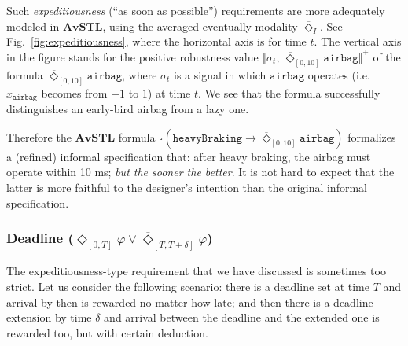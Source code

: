 \documentclass[envcountsect,orivec]{llncs} \usepackage{etex} \usepackage[]{graphicx}
\newcommand{\DiaOp}[1]{\Diamond_{#1}}
\newcommand{\BoxOp}[1]{\square_{#1}}
\newcommand{\TDiaOp}[1]{\overline{\Diamond}_{#1}}
\newcommand{\Robust}[2]{{ \llbracket #1,\, #2 \rrbracket}}
\newcommand{\AvSTL}{\textbf{AvSTL}}
\begin{document}
Such  \emph{expeditiousness} (``as soon as possible'') requirements
are more adequately  modeled in $\AvSTL$,  using the averaged-eventually modality
 $\TDiaOp{I}$. See Fig.~\ref{fig:expeditiousness}, where
the horizontal axis is
for time $t$. The vertical axis in the figure stands for the positive
robustness  value
$\Robust{\sigma_{t}}{\TDiaOp{[0,10]}\mathtt{airbag}}^{+}$ of the formula
$\TDiaOp{[0,10]}\mathtt{airbag}$, where $\sigma_{t}$ is a signal in
which $\mathtt{airbag}$ operates 
(i.e. $x_{\mathtt{airbag}}$ becomes from $-1$ to $1$) at time $t$. 
We see that the formula successfully distinguishes an early-bird
airbag from a lazy one.

Therefore the $\AvSTL$ formula
\begin{math}
     \BoxOp{} (
    \mathtt{heavyBraking} \to 
\TDiaOp{[0,10]}\mathtt{airbag} )
\end{math} formalizes
 a (refined) informal specification that: after heavy braking, the airbag must
operate within 10 ms; \emph{but the sooner the better}. It is not hard
to expect that the latter is
 more faithful to the designer's intention than the
original informal specification.





















\subsubsection{Deadline ($\DiaOp{[0,T]}\varphi\lor
   \TDiaOp{[T,T+\delta]}\varphi$)}
 The expeditiousness-type requirement that we have discussed is sometimes too
 strict. Let us consider the following scenario: there is a deadline set
 at time $T$ and arrival by then is rewarded no matter how late; and then there is a
 deadline extension by time $\delta$ and arrival between the deadline
 and the extended one is rewarded too, but with certain deduction. 
\end{document}
